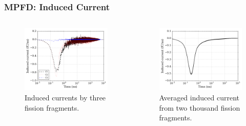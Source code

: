 \documentclass[fleqn]{beamer}
\begin{document}
\begin{frame}
 \frametitle{MPFD: Induced Current}
 \begin{columns}[c]
 \begin{column}{.5\textwidth}
 \begin{figure}
 \centering
  \includegraphics[width = \textwidth]{micro_3c_log}
  \caption{Induced currents by three fission fragments.}
  \end{figure}
 \end{column}

  \begin{column}{.5\textwidth}
  \begin{figure}
    \centering
 \includegraphics[width = \textwidth]{micro_avg_log}
 \caption{Averaged induced current from two thousand fission fragments.}
 \end{figure}
  \end{column}

 \end{columns}
\end{frame}
\end{document}
